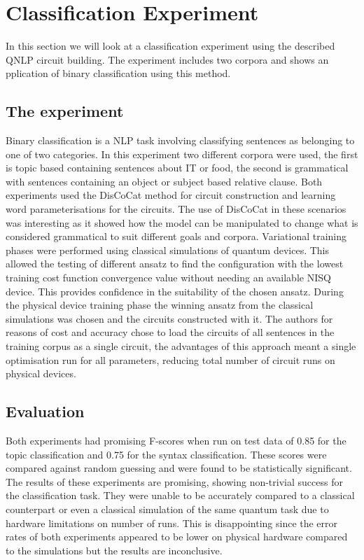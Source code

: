 \documentclass[a4paper,twocolumn,11pt]{quantumarticle}
\begin{document}
    \section{Classification Experiment}\label{sec:classification_exp}
    In this section we will look at a classification experiment using the described QNLP circuit building.
    The experiment includes two corpora and shows an pplication of binary classification using this method.
    \subsection{The experiment}\label{subsec:binary-classification}
    Binary classification is a NLP task involving classifying sentences as belonging to one of two categories.
    In this experiment two different corpora were used, the first is topic based containing sentences
    about IT or food\cite{qnlp_in_prac}, the second is grammatical with sentences containing an object or
    subject based relative clause.
    Both experiments used the DisCoCat method for circuit construction and learning word  parameterisations for the circuits.
    The use of DisCoCat in these scenarios was interesting as it showed how the model can be manipulated to change
    what is considered grammatical to suit different goals and corpora\cite{qnlp_in_prac}.
    \newline
    Variational training phases were performed using classical simulations of quantum devices.
    This allowed the testing of different ansatz to find the configuration with the lowest training cost function
    convergence value without needing an available NISQ device\cite{qnlp_in_prac}.
    This provides confidence in the suitability of the chosen ansatz.
    During the physical device training phase the winning ansatz from the classical simulations was chosen and the circuits
    constructed with it.
    The authors for reasons of cost and accuracy chose to load the circuits of all sentences in the training corpus as
    a single circuit, the advantages of this approach meant a single optimisation run for all parameters, reducing total
    number of circuit runs on physical devices.
    \subsection{Evaluation}\label{subsec:evaluation}
    Both experiments had promising F-scores when run on test data of 0.85 for the topic classification and 0.75 for
    the syntax classification\cite{qnlp_in_prac}.
    These scores were compared against random guessing and were found to be statistically significant\cite{qnlp_in_prac}.
    The results of these experiments are promising, showing non-trivial success for the classification task.
    They were unable to be accurately compared to a classical counterpart or even a classical simulation of the same
    quantum task due to hardware limitations on number of runs.
    This is disappointing since the error rates of both experiments appeared to be lower on physical hardware compared
    to the simulations but the results are inconclusive\cite{qnlp_in_prac}.
\end{document}
